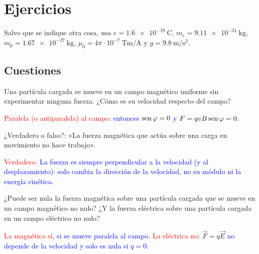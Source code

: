 
\section{Ejercicios}\label{sec:mag-ejercicios}

Salvo que se indique otra cosa, usa \(e = \qty{1.6e-19}{\coulomb}\), \(m_e = \qty{9.11e-31}{\kg}\), \(m_p = \qty{1.67e-27}{\kg}\),
\(\mu_0 = 4\pi\cdot 10^{-7}\ \unit{\tesla\m\per\ampere}\) y \(g = \qty{9.8}{\m\per\second\squared}\).

\subsection{Cuestiones}

\begin{exercise}
    Una partícula cargada se mueve en un campo magnético uniforme sin experimentar ninguna fuerza. ¿Cómo es su velocidad respecto del campo?
    \begin{solu}
        \textcolor{red}{Paralela (o antiparalela) al campo}: \textcolor{blue}{entonces \(\operatorname{sen}\varphi = 0\) y \(F = qvB\operatorname{sen}\varphi = 0\).}
    \end{solu}
\end{exercise}

\begin{exercise}
    ¿Verdadero o falso?: «La fuerza magnética que actúa sobre una carga en movimiento no hace trabajo».
    \begin{solu}
        \textcolor{red}{Verdadero.} \textcolor{blue}{La fuerza es siempre perpendicular a la velocidad (y al desplazamiento): solo cambia la dirección
        de la velocidad, no su módulo ni la energía cinética.}
    \end{solu}
\end{exercise}

\begin{exercise}
    ¿Puede ser nula la fuerza magnética sobre una partícula cargada que se mueve en un campo magnético no nulo? ¿Y la fuerza eléctrica
    sobre una partícula cargada en un campo eléctrico no nulo?
    \begin{solu}
        \textcolor{red}{La magnética sí}, \textcolor{blue}{si se mueve paralela al campo.} \textcolor{red}{La eléctrica no}: \(\vec F = q\vec E\)
        \textcolor{blue}{no depende de la velocidad y solo es nula si \(q = 0\).}
    \end{solu}
\end{exercise}

